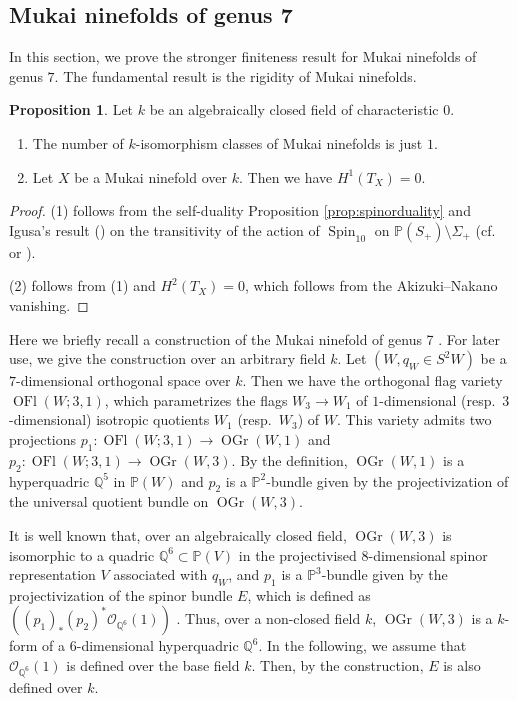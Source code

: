 \documentclass[autodetect-engine, a4paper]{amsart}
\theoremstyle{definition}
\newtheorem{prop}[thm]{Proposition}
\def\P{{\mathbb P}}
\def\Q{{\mathbb Q}}
\def\cO{\mathcal{O}}
\DeclareMathOperator{\Spin}{\mathrm{Spin}}
\DeclareMathOperator\OGr{\mathrm{OGr}}
\DeclareMathOperator\OFl{\mathrm{OFl}}
\begin{document}
\subsection{Mukai ninefolds of genus 7}
In this section, we prove the stronger finiteness result for Mukai ninefolds of genus $7$.
The fundamental result is the rigidity of Mukai ninefolds.

\begin{prop}
Let $k$ be an algebraically closed field of characteristic $0$.
\begin{enumerate}
\item 
The number of $k$-isomorphism classes of Mukai ninefolds is just $1$.
\item 
Let $X$ be a Mukai ninefold over $k$. Then we have $H^1 (T_{X}) =0$.
\end{enumerate}
\end{prop}

\begin{proof}
(1) follows from the self-duality Proposition \ref{prop:spinorduality} and Igusa's result (\cite{Igusa}) on the transitivity of the action of $\Spin_{10}$ on $\P(S_{+}) \setminus \Sigma_{+}$ (cf.\ \cite[Proposition 1.13]{Mukaicurve} or \cite[Section 5]{Kuznetsovspinor}).

(2) follows from (1) and $H^2 (T_X) =0$, which follows from the Akizuki--Nakano vanishing.
\end{proof}

Here we briefly recall a construction of the Mukai ninefold of genus 7 \cite[\S5.4]{Kuznetsovspinor}.
For later use, we give the construction over an arbitrary field $k$.
Let $(W, q_W \in S^2W)$ be a $7$-dimensional orthogonal space over $k$.
Then we have the orthogonal flag variety $\OFl(W;3,1)$, which parametrizes the flags $W_3 \to W_1$ of $1$-dimensional (resp.\ $3$-dimensional) isotropic quotients $W_1$ (resp.\ $W_3$) of $W$.
This variety admits two projections $p_1 \colon \OFl(W;3,1) \to \OGr(W,1)$ and $p_2 \colon \OFl(W;3,1) \to \OGr(W,3)$.
By the definition, $\OGr(W,1)$ is a hyperquadric $\Q^5$ in $\P(W)$ and $p_2$ is a $\P^2$-bundle given by the projectivization of the universal quotient bundle on $\OGr(W,3)$.

It is well known that, over an algebraically closed field,  $\OGr(W,3)$ is isomorphic to a quadric $\Q^6 \subset \P(V)$ in the projectivised $8$-dimensional spinor representation $V$ associated with $q_W$, and $p_1$ is a $\P^3$-bundle given by the projectivization of the spinor bundle $E$, which is defined as $((p_1)_*(p_2)^* \cO_{\Q^6}(1))$ \cite{Ott88}.
Thus, over a non-closed field $k$, $\OGr(W,3)$ is a $k$-form of a $6$-dimensional hyperquadric $\Q^6$.
In the following, we assume that $\cO_{\Q^6}(1)$ is defined over the base field $k$.
Then, by the construction, $E$ is also defined over $k$.
\end{document}
